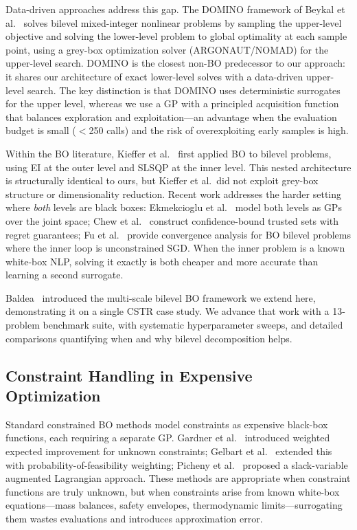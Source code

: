 \documentclass[12pt,a4paper]{article}%
\theoremstyle{plain}%
\theoremstyle{remark}%
\theoremstyle{definition}%
\begin{document}
Data-driven approaches address this gap. The DOMINO framework of Beykal et al.~\cite{beykal2020domino} solves bilevel mixed-integer nonlinear problems by sampling the upper-level objective and solving the lower-level problem to global optimality at each sample point, using a grey-box optimization solver (ARGONAUT/NOMAD) for the upper-level search. DOMINO is the closest non-BO predecessor to our approach: it shares our architecture of exact lower-level solves with a data-driven upper-level search. The key distinction is that DOMINO uses deterministic surrogates for the upper level, whereas we use a GP with a principled acquisition function that balances exploration and exploitation---an advantage when the evaluation budget is small ($<$250 calls) and the risk of overexploiting early samples is high.

Within the BO literature, Kieffer et al.~\cite{kieffer2017bilevel} first applied BO to bilevel problems, using EI at the outer level and SLSQP at the inner level. This nested architecture is structurally identical to ours, but Kieffer et al.\ did not exploit grey-box structure or dimensionality reduction. Recent work addresses the harder setting where \emph{both} levels are black boxes: Ekmekcioglu et al.~\cite{ekmekcioglu2024bilevel} model both levels as GPs over the joint space; Chew et al.~\cite{chew2025bilbo} construct confidence-bound trusted sets with regret guarantees; Fu et al.~\cite{fu2024convergence} provide convergence analysis for BO bilevel problems where the inner loop is unconstrained SGD. When the inner problem is a known white-box NLP, solving it exactly is both cheaper and more accurate than learning a second surrogate.

Baldea~\cite{baldea2025multiscale} introduced the multi-scale bilevel BO framework we extend here, demonstrating it on a single CSTR case study. We advance that work with a 13-problem benchmark suite, with systematic hyperparameter sweeps, and detailed comparisons quantifying when and why bilevel decomposition helps.

\subsection{Constraint Handling in Expensive Optimization}

Standard constrained BO methods model constraints as expensive black-box functions, each requiring a separate GP. Gardner et al.~\cite{gardner2014} introduced weighted expected improvement for unknown constraints; Gelbart et al.~\cite{gelbart2014unknown} extended this with probability-of-feasibility weighting; Picheny et al.~\cite{picheny2016albo} proposed a slack-variable augmented Lagrangian approach. These methods are appropriate when constraint functions are truly unknown, but when constraints arise from known white-box equations---mass balances, safety envelopes, thermodynamic limits---surrogating them wastes evaluations and introduces approximation error.
\end{document}
